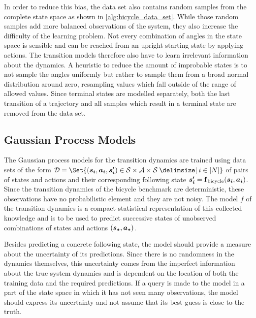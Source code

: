 In order to reduce this bias, the data set also contains random samples from the complete state space as shown in \cref{alg:bicycle_data_set}.
While those random samples add more balanced observations of the system, they also increase the difficulty of the learning problem.
Not every combination of angles in the state space is sensible and can be reached from an upright starting state by applying actions.
The transition models therefore also have to learn irrelevant information about the dynamics.
A heuristic to reduce the amount of improbable states is to not sample the angles uniformly but rather to sample them from a broad normal distribution around zero, resampling values which fall outside of the range of allowed values.
Since terminal states are modelled separately, both the last transition of a trajectory and all samples which result in a terminal state are removed from the data set.

\subsection{Gaussian Process Models}
\label{sub:gp_models}
The Gaussian process models for the transition dynamics are trained using data sets of the form $\D = \Set{(\mat{s_i}, \mat{a_i}, \mat{s_i^\prime}) \in \Es \times \Ah \times \Es \with i \in [N]}$ of pairs of states and actions and their corresponding following state $\bm{s_i^\prime} = \operatorname{\operatorname{\mathbf{f}}_{\text{bicycle}}}(\bm{s_i}, \bm{a_i})$.
Since the transition dynamics of the bicycle benchmark are deterministic, these observations have no probabilistic element and they are not noisy.
The model $f$ of the transition dynamics is a compact statistical representation of this collected knowledge and is to be used to predict successive states of unobserved combinations of states and actions $(\bm{s_\ast}, \bm{a_\ast})$.

Besides predicting a concrete following state, the model should provide a measure about the uncertainty of its predictions.
Since there is no randomness in the dynamics themselves, this uncertainty comes from the imperfect information about the true system dynamics and is dependent on the location of both the training data and the required predictions.
If a query is made to the model in a part of the state space in which it has not seen many observations, the model should express its uncertainty and not assume that its best guess is close to the truth.

